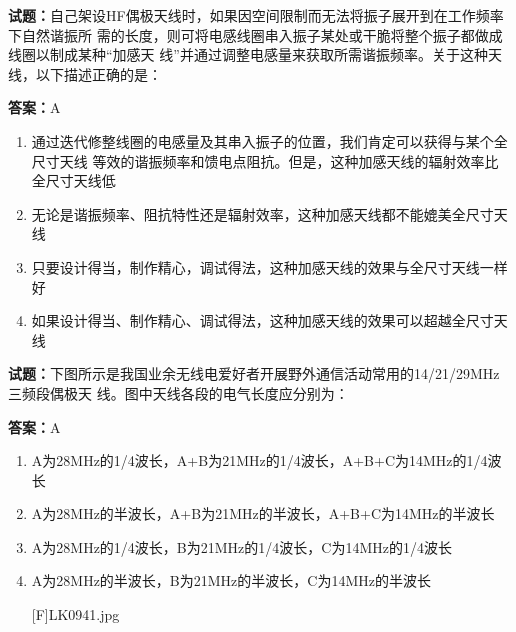 \documentclass{ctexbook}
\begin{document}




\vspace{1em}

\textbf{试题：}自己架设HF偶极天线时，如果因空间限制而无法将振子展开到在工作频率下自然谐振所
需的长度，则可将电感线圈串入振子某处或干脆将整个振子都做成线圈以制成某种“加感天
线”并通过调整电感量来获取所需谐振频率。关于这种天线，以下描述正确的是： 

\textbf{答案：}A 

\begin{enumerate}[leftmargin=3em]
  \item 通过迭代修整线圈的电感量及其串入振子的位置，我们肯定可以获得与某个全尺寸天线
等效的谐振频率和馈电点阻抗。但是，这种加感天线的辐射效率比全尺寸天线低 

  \item 无论是谐振频率、阻抗特性还是辐射效率，这种加感天线都不能媲美全尺寸天线 

  \item 只要设计得当，制作精心，调试得法，这种加感天线的效果与全尺寸天线一样好 

  \item 如果设计得当、制作精心、调试得法，这种加感天线的效果可以超越全尺寸天线 

\end{enumerate}





\vspace{1em}

\textbf{试题：}下图所示是我国业余无线电爱好者开展野外通信活动常用的14/21/29MHz三频段偶极天
线。图中天线各段的电气长度应分别为： 

\textbf{答案：}A 

\begin{enumerate}[leftmargin=3em]
  \item A为28MHz的1/4波长，A+B为21MHz的1/4波长，A+B+C为14MHz的1/4波长 

  \item A为28MHz的半波长，A+B为21MHz的半波长，A+B+C为14MHz的半波长 

  \item A为28MHz的1/4波长，B为21MHz的1/4波长，C为14MHz的1/4波长 

  \item A为28MHz的半波长，B为21MHz的半波长，C为14MHz的半波长 

[F]LK0941.jpg 

\end{enumerate}
\end{document}
